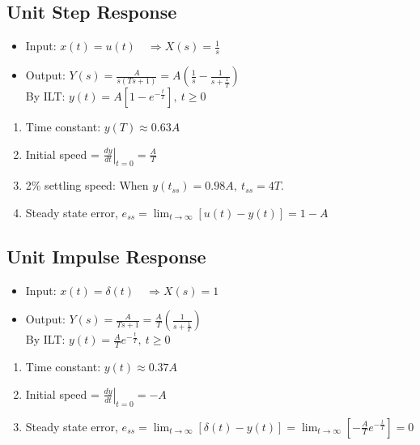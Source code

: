 \documentclass[a4paper]{article}
\begin{document}
\subsection{Unit Step Response}
\begin{itemize}
    \item Input: $x(t) = u(t)\quad \Rightarrow X(s) = \displaystyle\frac{1}{s}$
    \item Output: $Y(s) = \displaystyle\frac{A}{s(Ts+1)} = A\left(\frac{1}{s}-\frac{1}{s+\frac{1}{T}}\right)$\\
    By ILT: $y(t) = A\left[1-e^{-\frac{t}{T}}\right],\ t\geq 0$
\end{itemize}
\begin{enumerate}
    \item Time constant: $y(T) \approx 0.63A$
    \item Initial speed = $\displaystyle\left.\frac{dy}{dt}\right|_{t = 0} = \frac{A}{T}$
    \item 2\% settling speed: When $y(t_{ss}) = 0.98A,\ t_{ss} = 4T$.
    \item Steady state error, $e_{ss} = \displaystyle\lim_{t\to\infty}\left[u(t)-y(t)\right] = 1-A$
\end{enumerate}
\subsection{Unit Impulse Response}
\begin{itemize}
    \item Input: $x(t) = \delta(t)\quad \Rightarrow X(s) = 1$
    \item Output: $Y(s) = \displaystyle\frac{A}{Ts+1} = \frac{A}{T}\left(\frac{1}{s+\frac{1}{T}}\right)$\\
    By ILT: $y(t) = \displaystyle\frac{A}{T}e^{-\frac{t}{T}},\ t\geq 0$
\end{itemize}
\begin{enumerate}
    \item Time constant: $y(t) \approx 0.37A$
    \item Initial speed = $\displaystyle\left.\frac{dy}{dt}\right|_{t=0} = -A$
    \item Steady state error, $e_{ss} = \displaystyle\lim_{t\to\infty}\left[\delta(t)-y(t)\right] = \displaystyle\lim_{t\to\infty}\left[-\displaystyle\frac{A}{T}e^{-\frac{t}{T}}\right] = 0$
\end{enumerate}
\end{document}

